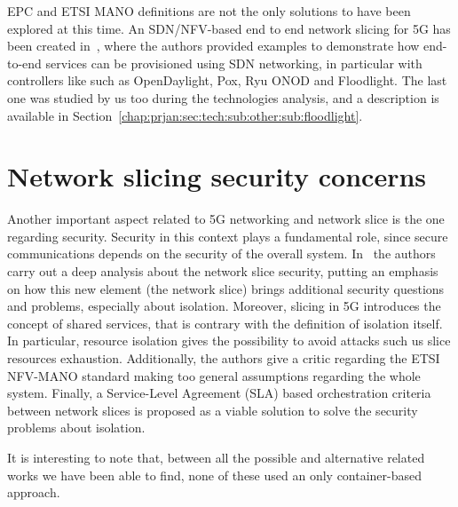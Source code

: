 EPC and ETSI MANO definitions are not the only solutions to have been explored
at this time. An SDN/NFV-based end to end network slicing for 5G has been
created in~\cite{chartsias2017sdn}, where the authors provided examples to
demonstrate how end-to-end services can be provisioned using SDN networking, in
particular with controllers like such as OpenDaylight, Pox, Ryu ONOD and
Floodlight. The last one was studied by us too during the technologies analysis,
and a description is available in
Section~\ref{chap:prjan:sec:tech:sub:other:sub:floodlight}.

\section{Network slicing security concerns}

Another important aspect related to 5G networking and network slice is the one
regarding security. Security in this context plays a fundamental role, since
secure communications depends on the security of the overall system.
In~\cite{kotulski2017end} the authors carry out a deep analysis about the
network slice security, putting an emphasis on how this new element (the network
slice) brings additional security questions and problems, especially about
isolation. Moreover, slicing in 5G introduces the concept of shared services,
that is contrary with the definition of isolation itself. In particular, 
resource isolation gives the possibility to avoid attacks such us slice 
resources exhaustion. Additionally, the authors give a critic regarding the 
ETSI NFV-MANO standard making too general assumptions regarding the whole 
system. Finally, a Service-Level Agreement (SLA) based orchestration criteria 
between network slices is proposed as a viable solution to solve the security 
problems about isolation.

\vspace{1cm}

\noindent It is interesting to note that, between all the possible and 
alternative related works we have been able to find, none of these used an only
container-based approach.
